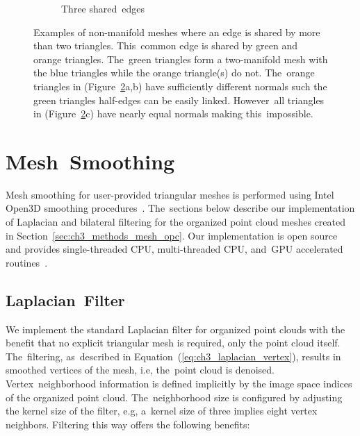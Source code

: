 \begin{figure}[H]
\begin{subfigure}{.30\linewidth}
    \caption{Three shared~edges\label{fig:ch3_NonMainifoldCond2C}}\vspace{6pt}
  \end{subfigure}
  \caption[Example non-manifold meshes with condition two violations]{Examples of non-manifold meshes where an edge is shared by more than two triangles. This~common edge is shared by green and orange triangles. The~green triangles form a two-manifold mesh with the blue triangles while the orange triangle(s) do not. The~orange triangles in (Figure~\ref{fig:ch3_NonMainifoldCond2}a,b) have sufficiently different normals such the green triangles half-edges can be easily linked. However~all triangles in (Figure~\ref{fig:ch3_NonMainifoldCond2}c) have nearly equal normals making this~impossible.}\label{fig:ch3_NonMainifoldCond2}
\end{figure}
\unskip




\section{Mesh~Smoothing}\label{sec:ch3_methods_mesh_smoothing}

Mesh smoothing for user-provided triangular meshes is performed using Intel Open3D smoothing procedures~\cite{zhou_open3d_2018}.  The~sections below describe our implementation of Laplacian and bilateral filtering for the organized point cloud meshes created in Section~\ref{sec:ch3_methods_mesh_opc}.  Our implementation is open source and provides single-threaded CPU, multi-threaded CPU, and~GPU accelerated routines~\cite{Castagno_Github_opf}. 

\subsection{Laplacian~Filter}\label{sec:ch3_methods_mesh_smoothing_laplacian}

We implement the standard Laplacian filter for organized point clouds with the benefit that no explicit triangular mesh is required, only the point cloud itself. The~filtering, as~described in Equation~(\ref{eq:ch3_laplacian_vertex}), results in smoothed vertices of the mesh, i.e, the~point cloud is denoised. Vertex~neighborhood information is defined implicitly by the image space indices of the organized point cloud.  The~neighborhood size is configured by adjusting the kernel size of the filter, e.g, a~kernel size of three implies eight vertex neighbors. Filtering this way offers the following benefits:

